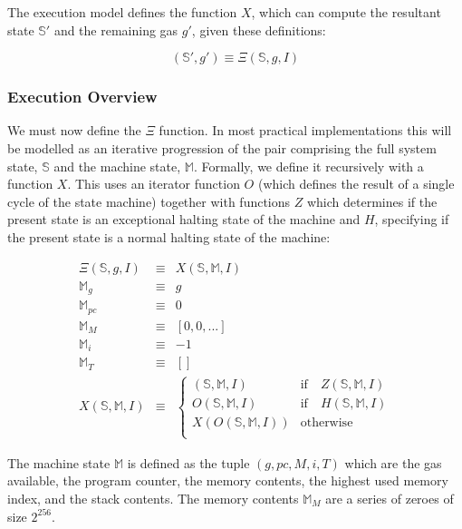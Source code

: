 \documentclass[9pt,oneside]{amsart}
\begin{document}
\begin{multicols}{2}
The execution model defines the function $X$, which can compute the resultant state $\mathbb{S}'$ and the remaining gas $g'$, given these definitions:

\begin{equation}
(\mathbb{S}', g') \equiv \Xi(\mathbb{S}, g, I)
\end{equation}

\subsubsection{Execution Overview}

We must now define the $\Xi$ function. In most practical implementations this will be modelled as an iterative progression of the pair comprising the full system state, $\mathbb{S}$ and the machine state, $\mathbb{M}$. Formally, we define it recursively with a function $X$. This uses an iterator function $O$ (which defines the result of a single cycle of the state machine) together with functions $Z$ which determines if the present state is an exceptional halting state of the machine and $H$, specifying if the present state is a normal halting state of the machine:

\begin{eqnarray}
\Xi(\mathbb{S}, g, I) & \equiv & X(\mathbb{S}, \mathbb{M}, I) \\
\mathbb{M}_g & \equiv & g \\
\mathbb{M}_{pc} & \equiv & 0 \\
\mathbb{M}_M & \equiv & [0, 0, ...] \\
\mathbb{M}_i & \equiv & -1 \\
\mathbb{M}_T & \equiv & [] \\
X(\mathbb{S}, \mathbb{M}, I) & \equiv & \begin{cases}
(\mathbb{S}, \mathbb{M}, I) & \text{if} \quad Z(\mathbb{S}, \mathbb{M}, I)\\
O(\mathbb{S}, \mathbb{M}, I) & \text{if} \quad H(\mathbb{S}, \mathbb{M}, I)\\
X(O(\mathbb{S}, \mathbb{M}, I)) & \text{otherwise}\\
\end{cases}
\end{eqnarray}

The machine state $\mathbb{M}$ is defined as the tuple $(g, pc, M, i, T)$ which are the gas available, the program counter, the memory contents, the highest used memory index, and the stack contents. The memory contents $\mathbb{M}_M$ are a series of zeroes of size $2^{256}$.


\end{multicols}
\end{document}
